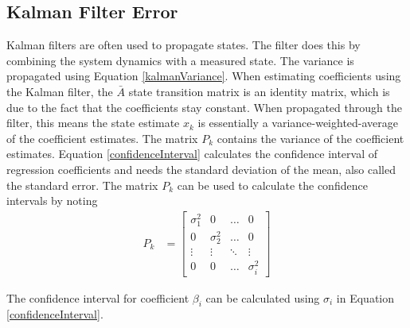 \subsection*{Kalman Filter Error}
Kalman filters are often used to propagate states. The filter does this by combining the system dynamics with a measured state. The variance is propagated using Equation \ref{kalmanVariance}. When estimating coefficients using the Kalman filter, the $\bar{A}$ state transition matrix is an identity matrix, which is due to the fact that the coefficients stay constant. When propagated through the filter, this means the state estimate $x_k$ is essentially a variance-weighted-average of the coefficient estimates. The matrix $P_k$ contains the variance of the coefficient estimates. Equation \ref{confidenceInterval} calculates the confidence interval of regression coefficients and needs the standard deviation of the mean, also called the standard error. The matrix $P_k$ can be used  to calculate the confidence intervals by noting
\begin{align}
P_k &= \begin{bmatrix}
\sigma_{1}^2 &  0  & \ldots & 0\\
0  &  \sigma_{2}^2 & \ldots & 0\\
\vdots & \vdots & \ddots & \vdots\\
0  &   0       &\ldots & \sigma_i^2
\end{bmatrix}
\end{align}

The confidence interval for coefficient $\beta_i$ can be calculated using $\sigma_i$ in Equation \ref{confidenceInterval}.
